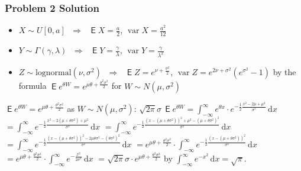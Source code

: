 \documentclass[10pt]{beamer}
\newcommand{\ds}{\displaystyle}
\newcommand{\ie}{\;\Longrightarrow\;}
\DeclareMathOperator\expc{\mathsf{E}}
\DeclareMathOperator\var{var}
\theoremstyle{definition}
\begin{document}
\begin{frame}[allowframebreaks]
  \frametitle{Problem 2 Solution}
  \begin{itemize}
    \item $X\sim U[0, a]$ $\ie$ $\ds\expc X = \frac{a}{2}$, $\ds\var X = \frac{a^2}{12}$ 
    \item $Y\sim \Gamma(\gamma, \lambda)$ $\ie$ $\ds\expc Y = \frac{\gamma}{\lambda}$, $\ds\var Y = \frac{\gamma}{\lambda^2}$
    \item $Z\sim\text{lognormal}(\nu,\sigma^2)$ $\ie$ $\ds\expc Z = e^{\nu + \frac{\sigma^2}{2}}$, $\ds\var Z = e^{2\nu + \sigma^2}(e^{\sigma^2} - 1)$ by the formula $\ds\expc{e^{\theta W}} = e^{\mu\theta + \frac{\theta^2\sigma^2}{2}}$ for $W\sim N(\mu, \sigma^2)$     
  \end{itemize}
  $\ds\expc{e^{\theta W}} = e^{\mu\theta + \frac{\theta^2\sigma^2}{2}}$ as $W\sim N(\mu, \sigma^2)$: $\ds\sqrt{2\pi}\sigma\,\expc{e^{\theta W}} = \int_{-\infty}^\infty e^{\theta x}\cdot e^{-\frac{1}{2}\frac{x^2 - 2\mu + \mu^2}{\sigma^2}}\,\text{d}x$ $\ds = \int_{-\infty}^\infty e^{-\frac{1}{2}\frac{x^2 - 2(\mu + \theta\sigma^2) + \mu^2}{\sigma^2}}\,\text{d}x$ $\ds = \int_{-\infty}^\infty e^{-\frac{1}{2}\frac{(x - (\mu + \theta\sigma^2))^2 + \mu^2 - (\mu + \theta\sigma^2)^2}{\sigma^2}}\,\text{d}x$ $\ds = \int_{-\infty}^\infty e^{-\frac{1}{2}\frac{(x - (\mu + \theta\sigma^2))^2 - 2\mu\theta\sigma^2 - (\theta\sigma^2)^2}{\sigma^2}}\,\text{d}x$ $\ds = e^{\mu\theta + \frac{\theta^2\sigma^2}{2}}\cdot\int_{-\infty}^\infty e^{-\frac{1}{2}\frac{(x - (\mu + \theta\sigma^2))^2}{\sigma^2}}\,\text{d}x$ $\ds = e^{\mu\theta + \frac{\theta^2\sigma^2}{2}}\cdot\int_{-\infty}^\infty e^{-\frac{x^2}{2\sigma^2}}\,\text{d}x$ $\ds = \sqrt{2\pi}\sigma\cdot e^{\mu\theta + \frac{\theta^2\sigma^2}{2}}$ by $\ds\int_{-\infty}^{\infty}e^{-x^2}\,\text{d}x = \sqrt{\pi}$.


\end{frame}
\end{document}
